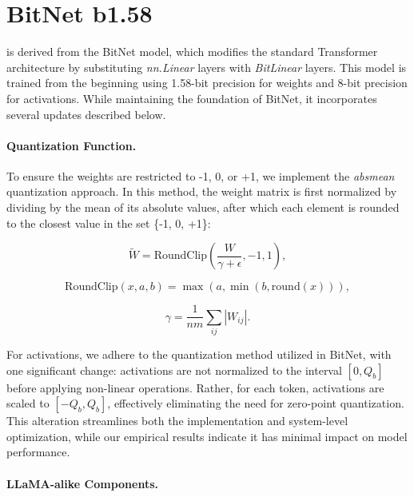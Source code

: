 \section{BitNet b1.58}

 is derived from the BitNet model, which modifies the standard Transformer architecture by substituting \emph{nn.Linear} layers with \emph{BitLinear} layers. This model is trained from the beginning using 1.58-bit precision for weights and 8-bit precision for activations. While maintaining the foundation of BitNet, it incorporates several updates described below.

\paragraph{Quantization Function.} To ensure the weights are restricted to -1, 0, or +1, we implement the \emph{absmean} quantization approach. In this method, the weight matrix is first normalized by dividing by the mean of its absolute values, after which each element is rounded to the closest value in the set \{-1, 0, +1\}:

\begin{equation}
    \widetilde{W} = \mathrm{RoundClip}(\frac{W}{\gamma + \epsilon}, -1, 1),
\end{equation}

\begin{equation}
    \mathrm{RoundClip}(x, a, b) = \max(a, \min(b, \mathrm{round}(x))),
\end{equation}

\begin{equation}
    \gamma = \frac{1}{nm}\sum_{ij} |W_{ij}|.
\end{equation}

For activations, we adhere to the quantization method utilized in BitNet, with one significant change: activations are not normalized to the interval $[0, Q_b]$ before applying non-linear operations. Rather, for each token, activations are scaled to $[-Q_b, Q_b]$, effectively eliminating the need for zero-point quantization. This alteration streamlines both the implementation and system-level optimization, while our empirical results indicate it has minimal impact on model performance.

\paragraph{LLaMA-alike Components.}

